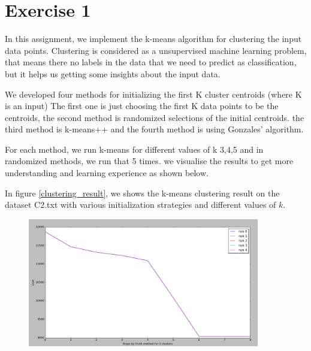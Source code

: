 \section*{Exercise 1}
In this assignment, we implement the k-means algorithm for clustering the input data points.
Clustering is considered as a unsupervised machine learning problem, that means there no labels in the data that we need to predict as classification, but it helps us getting some insights about the input data.

We developed four methods for initializing the first K cluster centroids (where K is an input)
The first one is just choosing the first K data points to be the centroids, the second method is randomized selections of the initial centroids. the third method is k-means++
and the fourth method is using Gonzales’ algorithm.

For each method, we run k-means for different values of k {3,4,5} and in randomized methods, we run that 5 times. we visualise the results to get more understanding and learning experience as shown below.

In figure \ref{clustering_result}, we shows the k-means clustering result on the dataset C2.txt with various initialization strategies and different values of $k$.

\begin{figure}[!h]
\centering
\includegraphics[width=0.9\textwidth]{shots/firstk5clusters.png}
\caption{ }
\label{barcharthover}
\end{figure}


